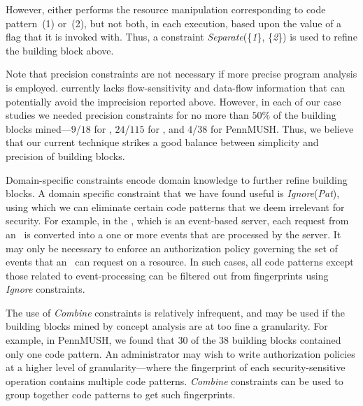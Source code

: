 However,  either performs the resource manipulation
corresponding to code pattern~(1) or~(2), but not both, in each execution,
based upon the value of a flag that it is invoked with. Thus, a constraint
\textit{Separate}(\{\textit{1}\}, \{\textit{2}\}) is used to refine the
building block above.

Note that precision constraints are not necessary if more precise program
analysis is employed.  currently lacks
flow-sensitivity and data-flow information that can potentially avoid the
imprecision reported above. However, in each of our case studies we needed
precision constraints for no more than $50\%$ of the building blocks
mined---$9$/$18$ for \ext, $24$/$115$ for \xserver, and $4$/$38$ for PennMUSH.
Thus, we believe that our current technique strikes a good balance between
simplicity and precision of building blocks.  

Domain-specific constraints encode domain knowledge to further refine building
blocks. A domain specific constraint that we have found useful is
\textit{Ignore}(\textit{Pat}), using which we can eliminate certain code
patterns that we deem irrelevant for security.  For example, in the \xserver,
which is an event-based server, each request from an \xclient\ is converted
into a one or more events that are processed by the server. It may only be
necessary to enforce an authorization policy governing the set of events that
an \xclient\ can request on a resource.  In such cases, all code patterns
except those related to event-processing can be filtered out from fingerprints
using \textit{Ignore} constraints.

The use of \textit{Combine} constraints is relatively infrequent, and may be
used if the building blocks mined by concept analysis are at too fine a
granularity. For example, in PennMUSH, we found that $30$ of the $38$ building
blocks contained only one code pattern. An administrator may wish to write
authorization policies at a higher level of granularity---where the fingerprint
of each security-sensitive operation contains multiple code patterns.
\textit{Combine} constraints can be used to group together code patterns to get
such fingerprints. 


